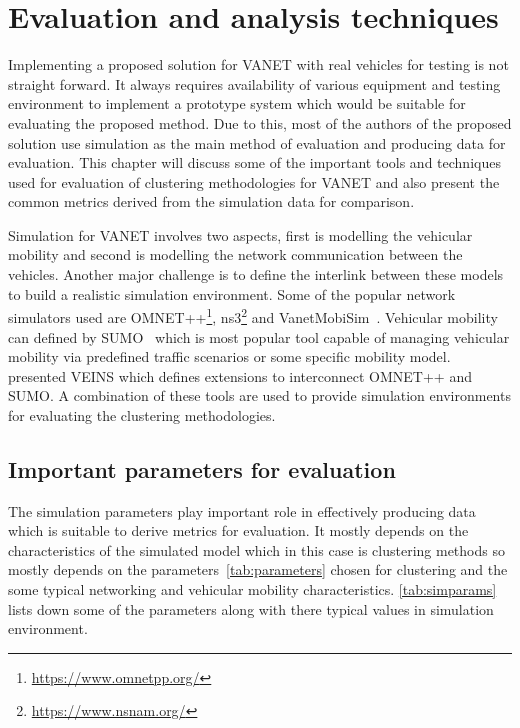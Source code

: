 \documentclass[]{ccs-thesis}
\begin{document}
\chapter{Evaluation and analysis techniques}
\label{sec:evaluation}

Implementing a proposed solution for \ac{VANET} with real vehicles for testing is not straight forward.
It always requires availability of various equipment and testing environment to implement a prototype system which
would be suitable for evaluating the proposed method. Due to this, most of the authors of the proposed solution use
simulation as the main method of evaluation and producing data for evaluation. This chapter will discuss some of
the important tools and techniques used for evaluation of clustering methodologies for \ac{VANET} and also present
the common metrics derived from the simulation data for comparison.

Simulation for \ac{VANET} involves two aspects, first is modelling the vehicular mobility and second is modelling the
network communication between the vehicles. Another major challenge is to define the interlink between these models
to build a realistic simulation environment. Some of the popular network simulators used are OMNET++\footnote{\url{https://www.omnetpp.org/}},
ns3\footnote{\url{https://www.nsnam.org/}} and VanetMobiSim~\cite{4127230}. Vehicular mobility can defined by SUMO~\cite{dlr71460}
which is most popular tool capable of managing vehicular mobility via predefined traffic scenarios or some specific mobility model.
\textcite{sommer2011bidirectionally} presented \ac{VEINS} which defines extensions to interconnect OMNET++ and SUMO. A combination of
these tools are used to provide simulation environments for evaluating the clustering methodologies.

\section{Important parameters for evaluation}

The simulation parameters play important role in effectively producing data which is suitable to derive metrics for evaluation.
It mostly depends on the characteristics of the simulated model which in this case is clustering methods so mostly depends
on the parameters~\cref{tab:parameters} chosen for clustering and the some typical networking and vehicular mobility
characteristics. \cref{tab:simparams} lists down some of the parameters along with there typical values in simulation environment.
\end{document}
